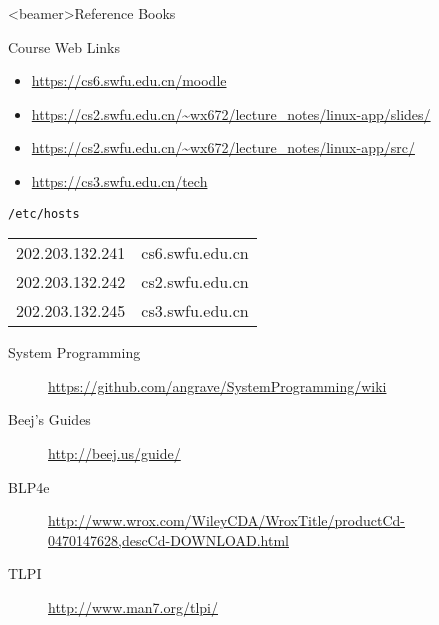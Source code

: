 \mode*
{}


\begin{frame}<beamer>{Reference Books}
  \begin{refsection}
    \textbooks \printbibliography[heading=none]
  \end{refsection}
\end{frame}

\begin{frame}{Course Web Links}
  \begin{itemize}
  \item[\moodle] \url{https://cs6.swfu.edu.cn/moodle}
  \item[\pdf] \url{https://cs2.swfu.edu.cn/~wx672/lecture_notes/linux-app/slides/}
  \item[\folder] \url{https://cs2.swfu.edu.cn/~wx672/lecture_notes/linux-app/src/}
  \item[\obook] \url{https://cs3.swfu.edu.cn/tech}
  \end{itemize}
  \begin{block}{\texttt{/etc/hosts}}
    \ttfamily
    \begin{tabular}{ll}
      202.203.132.241&cs6.swfu.edu.cn\\      
      202.203.132.242&cs2.swfu.edu.cn\\
      202.203.132.245&cs3.swfu.edu.cn\\      
    \end{tabular}
  \end{block}\footnotesize
  \begin{description}
  \item[System Programming] \url{https://github.com/angrave/SystemProgramming/wiki}
  \item[Beej's Guides] \url{http://beej.us/guide/}
  \item[BLP4e] \url{http://www.wrox.com/WileyCDA/WroxTitle/productCd-0470147628,descCd-DOWNLOAD.html}
  \item[TLPI] \url{http://www.man7.org/tlpi/}
  \end{description}
\end{frame}


